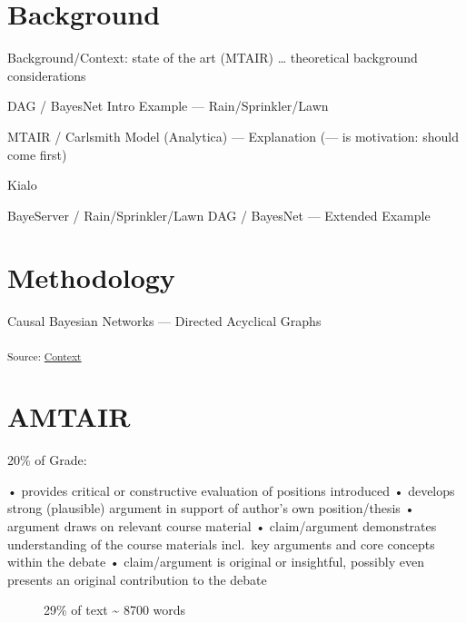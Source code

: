 \documentclass[11pt,a4paper]{report}
\begin{document}
\section{Background}\label{background}

Background/Context: state of the art (MTAIR) \ldots{} theoretical
background considerations

DAG / BayesNet Intro Example --- Rain/Sprinkler/Lawn

MTAIR / Carlsmith Model (Analytica) --- Explanation (--- is motivation:
should come first)

Kialo

BayeServer / Rain/Sprinkler/Lawn DAG / BayesNet --- Extended Example

\section{}\label{section-3}

\section{Methodology}\label{methodology}

Causal Bayesian Networks --- Directed Acyclical Graphs

\textsubscript{Source:
\href{https://VJMeyer.github.io/submission/chapters/Context-preview.html\#fd0f9ead-f4aa-4501-861c-4595acb4b0ef}{Context}}

\section{AMTAIR}\label{amtair}

20\% of Grade:

\begin{description}
\item[• provides critical or constructive evaluation of positions
introduced • develops strong (plausible) argument in support of author's
own position/thesis • argument draws on relevant course material •
claim/argument demonstrates understanding of the course materials
incl.~key arguments and core concepts within the debate • claim/argument
is original or insightful, possibly even presents an original
contribution to the debate]
29\% of text \textasciitilde{} 8700 words
\end{description}

\section{}\label{section-4}
\end{document}

